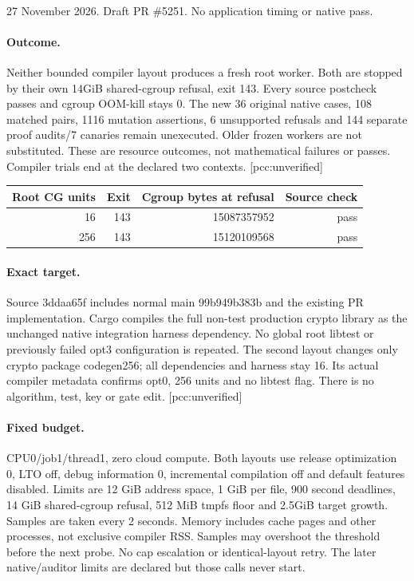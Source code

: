\documentclass[10pt,a4paper]{article}
\begin{document}
\\[4pt]
{\small 27 November 2026. Draft PR \#5251. No application timing or native pass.}
\paragraph{Outcome.} Neither bounded compiler layout produces a fresh root
worker. Both are stopped by their own 14GiB shared-cgroup refusal, exit 143.
Every source postcheck passes and cgroup OOM-kill stays 0. The new 36 original
native cases, 108 matched pairs, 1116 mutation assertions, 6 unsupported refusals
and 144 separate proof audits/7 canaries remain unexecuted. Older frozen workers
are not substituted. These are resource outcomes, not mathematical failures
or passes. Compiler trials end at the declared two contexts. [pcc:unverified]
\begin{center}\begin{tabular}{rrrr}\toprule
Root CG units & Exit & Cgroup bytes at refusal & Source check\\\midrule
16 & 143 & 15087357952 & pass \\
256 & 143 & 15120109568 & pass \\
\bottomrule\end{tabular}\end{center}
\paragraph{Exact target.} Source 3ddaa65f includes normal main 99b949b383b and
the existing PR implementation. Cargo compiles the full non-test production
crypto library as the unchanged native integration harness dependency. No
global root libtest or previously failed opt3 configuration is repeated. The
second layout changes only crypto package codegen256; all dependencies and
harness stay 16. Its actual compiler metadata confirms opt0, 256 units and no
libtest flag. There is no algorithm, test, key or gate edit. [pcc:unverified]
\paragraph{Fixed budget.} CPU0/job1/thread1, zero cloud compute. Both layouts
use release optimization 0, LTO off, debug information 0, incremental compilation
off and default features disabled. Limits are 12 GiB address space, 1 GiB per
file, 900 second deadlines, 14 GiB shared-cgroup refusal, 512 MiB tmpfs floor and
2.5GiB target growth. Samples are taken every 2 seconds. Memory includes cache pages
and other processes, not exclusive compiler RSS. Samples may overshoot the
threshold before the next probe. No cap escalation or identical-layout retry.
The later native/auditor limits are declared but those calls never start.
\end{document}
